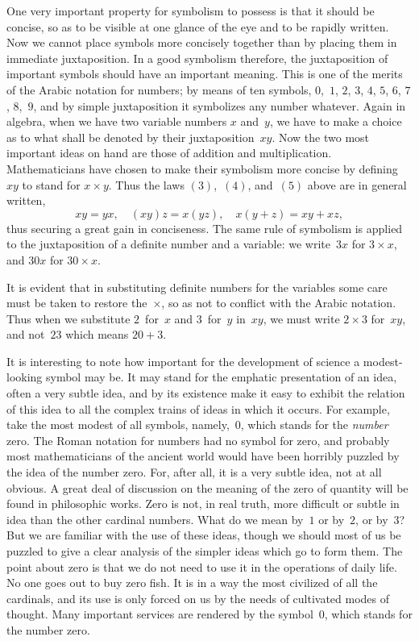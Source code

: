 \documentclass[12pt,leqno]{book}[2005/09/16]
\newcommand{\PageSep}[1]{\ignorespaces}
\newcommand{\Eq}[1]{\ensuremath{#1}}
\begin{document}
One very important property for symbolism
to possess is that it should be concise, so as to
be visible at one glance of the eye and to be
rapidly written. Now we cannot place symbols
more concisely together than by placing
them in immediate juxtaposition. In a good
symbolism therefore, the juxtaposition of important
\PageSep{62}
symbols should have an important
meaning. This is one of the merits of the
Arabic notation for numbers; by means of
ten symbols, $0$,~$1$, $2$, $3$, $4$, $5$, $6$, $7$, $8$,~$9$, and by
simple juxtaposition it symbolizes any number
whatever. Again in algebra, when we have
two variable numbers $x$ and~$y$, we have to
make a choice as to what shall be denoted by
their juxtaposition~$xy$. Now the two most
important ideas on hand are those of addition
and multiplication. Mathematicians have
chosen to make their symbolism more concise
by defining $xy$ to stand for $x × y$. Thus the
laws \Eq{(3)},~\Eq{(4)}, and~\Eq{(5)} above are in general
written,
\[
xy = yx,\quad
(xy)z = x(yz),\quad
x(y + z) = xy + xz,
\]
thus securing a great gain in conciseness.
The same rule of symbolism is applied to the
juxtaposition of a definite number and a variable:
we write~$3x$ for $3 × x$, and $30x$ for $30 × x$.

It is evident that in substituting definite
numbers for the variables some care must be
taken to restore the~$×$, so as not to conflict
with the Arabic notation. Thus when we
substitute $2$~for~$x$ and $3$~for~$y$ in~$xy$, we must
write $2 × 3$ for~$xy$, and not~$23$ which means
$20 + 3$.

It is interesting to note how important for
the development of science a modest-looking
symbol may be. It may stand for the emphatic
presentation of an idea, often a very
\PageSep{63}
subtle idea, and by its existence make it easy
to exhibit the relation of this idea to all the
complex trains of ideas in which it occurs.
For example, take the most modest of all
symbols, namely,~$0$, which stands for the \emph{number}
%
zero. The Roman notation for numbers
had no symbol for zero, and probably most
mathematicians of the ancient world would
have been horribly puzzled by the idea of the
number zero. For, after all, it is a very
subtle idea, not at all obvious. A great deal
of discussion on the meaning of the zero of
quantity will be found in philosophic works.
Zero is not, in real truth, more difficult or
subtle in idea than the other cardinal numbers.
What do we mean by~$1$ or by~$2$, or by~$3$?
But we are familiar with the use of these ideas,
though we should most of us be puzzled to
give a clear analysis of the simpler ideas
which go to form them. The point about zero
is that we do not need to use it in the operations
of daily life. No one goes out to buy
zero fish. It is in a way the most civilized
of all the cardinals, and its use is only forced
on us by the needs of cultivated modes of
thought. Many important services are rendered
by the symbol~$0$, which stands for the
number zero.
\end{document}
